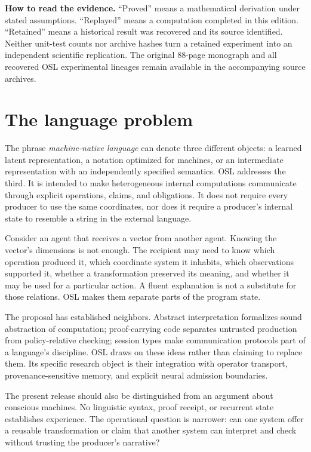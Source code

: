 \documentclass[11pt]{article}
\begin{document}
\begin{scopebox}
\textbf{How to read the evidence.} ``Proved'' means a mathematical derivation under stated assumptions. ``Replayed'' means a computation completed in this edition. ``Retained'' means a historical result was recovered and its source identified. Neither unit-test counts nor archive hashes turn a retained experiment into an independent scientific replication. The original 88-page monograph and all recovered OSL experimental lineages remain available in the accompanying source archives.
\end{scopebox}
\clearpage
\tableofcontents\clearpage

\section{The language problem}
The phrase \emph{machine-native language} can denote three different objects: a learned latent representation, a notation optimized for machines, or an intermediate representation with an independently specified semantics. OSL addresses the third. It is intended to make heterogeneous internal computations communicate through explicit operations, claims, and obligations. It does not require every producer to use the same coordinates, nor does it require a producer's internal state to resemble a string in the external language.

Consider an agent that receives a vector from another agent. Knowing the vector's dimensions is not enough. The recipient may need to know which operation produced it, which coordinate system it inhabits, which observations supported it, whether a transformation preserved its meaning, and whether it may be used for a particular action. A fluent explanation is not a substitute for those relations. OSL makes them separate parts of the program state.

The proposal has established neighbors. Abstract interpretation formalizes sound abstraction of computation; proof-carrying code separates untrusted production from policy-relative checking; session types make communication protocols part of a language's discipline. OSL draws on these ideas rather than claiming to replace them. Its specific research object is their integration with operator transport, provenance-sensitive memory, and explicit neural admission boundaries. \cite{cousot,necula,session}

The present release should also be distinguished from an argument about conscious machines. No linguistic syntax, proof receipt, or recurrent state establishes experience. The operational question is narrower: can one system offer a reusable transformation or claim that another system can interpret and check without trusting the producer's narrative?
\end{document}
